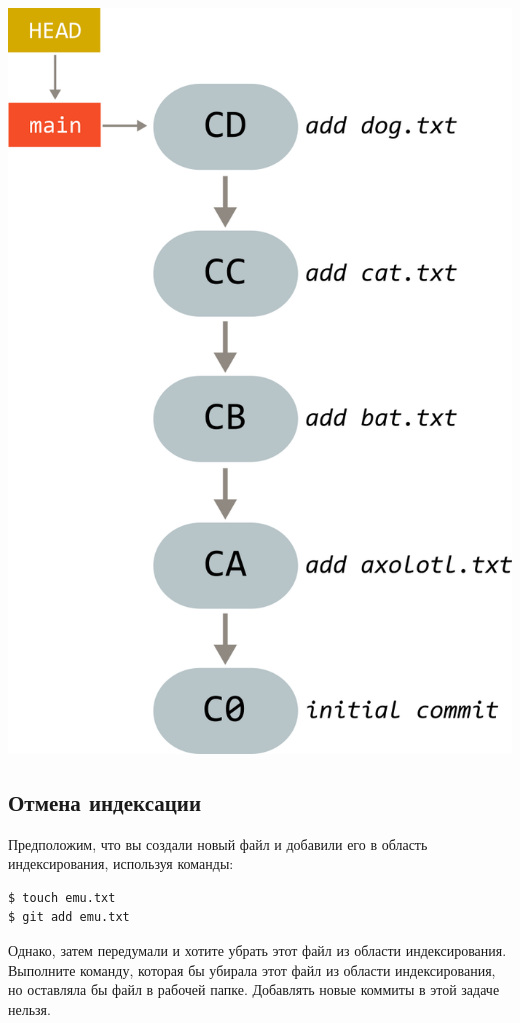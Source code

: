 \documentclass{article}
\begin{document}
\begin{center}
\includegraphics[scale=0.9]{../images/animals.png}
\end{center}



\subsection{Отмена индексации}
Предположим, что вы создали новый файл и добавили его в область индексирования, используя команды:
\begin{lstlisting}[style=csMiptBash]
$ touch emu.txt
$ git add emu.txt
\end{lstlisting}
Однако, затем передумали и хотите убрать этот файл из области индексирования.
Выполните команду, которая бы убирала этот файл из области индексирования, но оставляла бы файл в рабочей папке. Добавлять новые коммиты в этой задаче нельзя.
\end{document}
